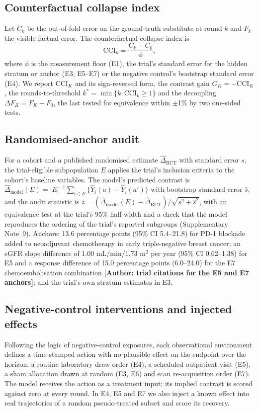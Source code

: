 \documentclass[11pt,a4paper]{article}
\newcommand{\authorpending}[1]{{\color{red}\textbf{[Author: #1]}}}
\newcommand{\CCI}{\mathrm{CCI}}
\begin{document}
\subsection{Counterfactual collapse index}
Let $C_k$ be the out-of-fold error on the ground-truth substitute at round $k$ and $F_k$ the visible factual error. The counterfactual collapse index is
\begin{equation}\label{eq:cci}
\CCI_k=\frac{C_k-C_0}{\phi},
\end{equation}
where $\phi$ is the measurement floor (E1), the trial's standard error for the hidden stratum or anchor (E3, E5--E7) or the negative control's bootstrap standard error (E4). We report $\CCI_K$ and its sign-reversed form, the contrast gain $G_K=-\CCI_K$, the rounds-to-threshold $k^*=\min\{k:\CCI_k\ge1\}$ and the decoupling $\Delta F_K=F_K-F_0$, the last tested for equivalence within $\pm$1\% by two one-sided tests.

\subsection{Randomised-anchor audit}
For a cohort and a published randomised estimate $\hat\Delta_{\mathrm{RCT}}$ with standard error $s$, the trial-eligible subpopulation $E$ applies the trial's inclusion criteria to the cohort's baseline variables. The model's predicted contrast is $\hat\Delta_{\mathrm{model}}(E)=|E|^{-1}\sum_{i\in E}\{\hat Y_i(a)-\hat Y_i(a')\}$ with bootstrap standard error $\hat s$, and the audit statistic is $z=(\hat\Delta_{\mathrm{model}}(E)-\hat\Delta_{\mathrm{RCT}})/\sqrt{s^2+\hat s^2}$, with an equivalence test at the trial's 95\% half-width and a check that the model reproduces the ordering of the trial's reported subgroups (Supplementary Note~9). Anchors: 13.6 percentage points (95\% CI 5.4--21.8) for PD-1 blockade added to neoadjuvant chemotherapy in early triple-negative breast cancer\cite{keynote522}; an eGFR slope difference of 1.00 mL/min/1.73 m$^2$ per year (95\% CI 0.62--1.38) for E5 and a response difference of 15.0 percentage points (6.0--24.0) for the E7 chemoembolisation combination \authorpending{trial citations for the E5 and E7 anchors}; and the trial's own stratum estimates in E3.

\subsection{Negative-control interventions and injected effects}
Following the logic of negative-control exposures\cite{lipsitch2010}, each observational environment defines a time-stamped action with no plausible effect on the endpoint over the horizon: a routine laboratory draw order (E4), a scheduled outpatient visit (E5), a sham allocation drawn at random (E3, E6) and scan re-acquisition order (E7). The model receives the action as a treatment input; its implied contrast is scored against zero at every round. In E4, E5 and E7 we also inject a known effect into real trajectories of a random pseudo-treated subset and score its recovery.
\end{document}
